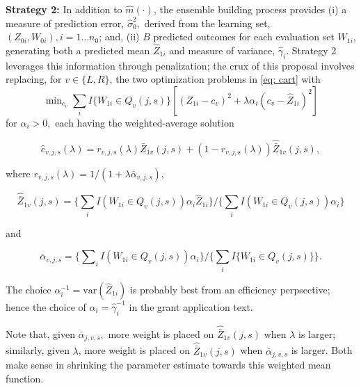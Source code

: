 \documentclass[12pt]{article}
\begin{document}
{\bf Strategy 2:} In addition to $\widehat{m}(\cdot)$, the
ensemble building process provides
(i) a measure of prediction error,
$\hat{\sigma}^2_0,$ derived from the learning set, $(Z_{0i}, W_{0i}), i = 1 \ldots n_0$;
and, (ii) $B$ predicted outcomes for each evaluation set $W_{1i}$, generating
both a predicted mean $\widehat{Z}_{1i}$ and measure of
variance, $\hat{\gamma}_{i}.$ Strategy 2 leverages this
information through penalization;
the crux of this proposal involves replacing,
for $v \in \{L,R\}$, the two optimization problems in
\eqref{eq: cart} with
\begin{equation}
  \label{bigopt}
  \min\nolimits_{c_v} {\textstyle \sum\nolimits}_i I\{W_{1i} \in
  Q_{v}(j,s)\} \left[ (Z_{1i}-c_v)^2 + \lambda \alpha_i
    (c_v-\widehat{Z}_{1i})^2 \right]
\end{equation}
for $\alpha_i > 0,$ each having the weighted-average solution 

\begin{equation}
	\label{chat}
	\widehat{c}_{v,j,s}(\lambda) =
	r_{v,j,s}(\lambda) \bar{Z}_{1v}(j,s) + (1-r_{v,j,s}(\lambda)) \hat{\bar{Z}}_{1v}(j,s),
\end{equation}

where $r_{v,j,s}(\lambda) = 1/(1 + \lambda \bar{\alpha}_{v,j,s}),$

\begin{equation}
	\hat{\bar{Z}}_{1v}(j,s) =
	\{ {\textstyle \sum\nolimits}_iI(W_{1i} \in Q_{v}(j,s)) \alpha_i  \hat{Z}_{1i} \}
	/ \{ {\textstyle \sum\nolimits}_i I(W_{1i} \in Q_{v}(j,s)) \alpha_i \}
\end{equation}

and

\begin{equation}
	\bar{\alpha}_{v,j,s} = \{ \sum\nolimits_i I(W_{1i} \in Q_{v}(j,s)) \alpha_i \}
	/ \{ \sum_i I\{ W_{1i} \in Q_{v}(j,s) \} \}.
\end{equation}

The choice $\alpha^{-1}_i = \mbox{var}( \hat{Z}_{1i} )$ is probably
best from an efficiency perpsective; hence the choice of
$\alpha_i = \hat{\gamma}^{-1}_{i}$ in the grant application text.

Note that, given $\bar{\alpha}_{j,v,s},$  more weight is placed on
$\hat{\bar{Z}}_{1v}(j,s)$ when $\lambda$ is larger; similarly, 
given $\lambda$, more weight is placed on
$\hat{\bar{Z}}_{1v}(j,s)$ when $\bar{\alpha}_{j,v,s}$ is larger.
Both make sense in shrinking the parameter estimate
towards this weighted mean function.
\end{document}
